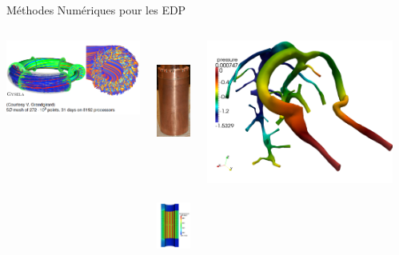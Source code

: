 \documentclass{beamer}
\begin{document}
\begin{frame}{M{\'e}thodes Num{\'e}riques pour les EDP}


  \begin{columns}
    \includegraphics[width=0.9\linewidth]{gysela.png}\\
    \centerline{\includegraphics[height=4cm]{Radial_magnet.jpg}\quad
    \includegraphics[height=4cm]{temperature.jpg}}
    \centerline{\includegraphics[width=.9\linewidth]{MesoChallengePressure.png}}\\

\end{columns}
\end{frame}
\end{document}
